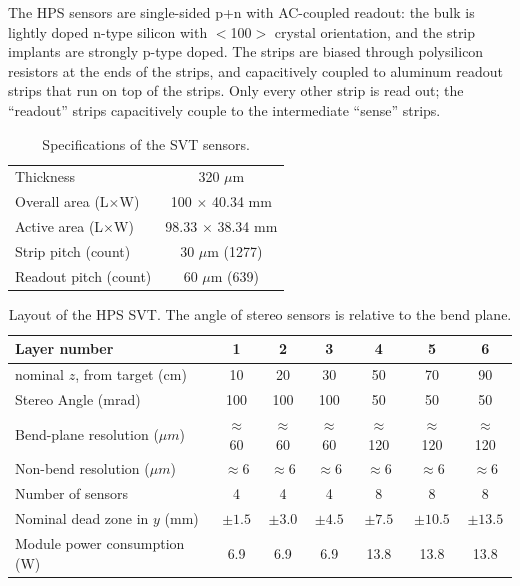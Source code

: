 The HPS sensors are single-sided p+n with AC-coupled readout: the bulk is lightly doped n-type silicon with $<$100$>$ crystal orientation, and the strip implants are strongly p-type doped.
The strips are biased through polysilicon resistors at the ends of the strips, and capacitively coupled to aluminum readout strips that run on top of the strips.
Only every other strip is read out; the ``readout'' strips capacitively couple to the intermediate ``sense'' strips.

\begin{table}[h]
    \begin{center}
        \begin{tabular}{lc}   
            \hline \hline
            Thickness & 320 $\mu$m \\
            Overall area (L$\times$W) & 100 $\times$ 40.34 mm\\
            Active area (L$\times$W) & 98.33 $\times$ 38.34 mm\\
            Strip pitch (count) & 30 $\mu$m (1277)\\
            Readout pitch (count) & 60 $\mu$m (639)\\
            \hline \hline
        \end{tabular}
        \caption{Specifications of the SVT sensors.}
        \label{tab:sensor_spec} 
    \end{center}
\end{table}

\begin{table}[h]
    \begin{center}
        \begin{tabular}{lcccccc}   
            \hline \hline 
            Layer number & 1 & 2 & 3 & 4 & 5 & 6 \\      
            \hline
            nominal $z$, from target (cm)  & 10 & 20 & 30 & 50 & 70  & 90 \\ 
            Stereo Angle (mrad)  & 100 & 100 & 100 & 50 & 50 & 50 \\ 
            Bend-plane resolution ($\mu m$)  & $\approx$60 & $\approx$60 & $\approx$60 & $\approx$120 & $\approx$120 & $\approx$120 \\ 
            Non-bend resolution ($\mu m$)  & $\approx$6 & $\approx$6 & $\approx$6 & $\approx$6 & $\approx$6  & $\approx$6 \\ 
            Number of sensors  & 4 & 4 & 4 & 8 & 8 & 8 \\ 
            Nominal dead zone in $y$ (mm)  & $\pm1.5$  & $\pm3.0$  & $\pm4.5$  & $\pm7.5$  & $\pm10.5$ & $\pm13.5$  \\ 
            Module power consumption (W) & 6.9 & 6.9 & 6.9 & 13.8 & 13.8 & 13.8 \\
            \hline \hline
        \end{tabular}
        \caption{Layout of the HPS SVT.  The angle of stereo sensors is relative to the bend plane.}
        \label{tab:svt_layout} 
    \end{center}
\end{table}


